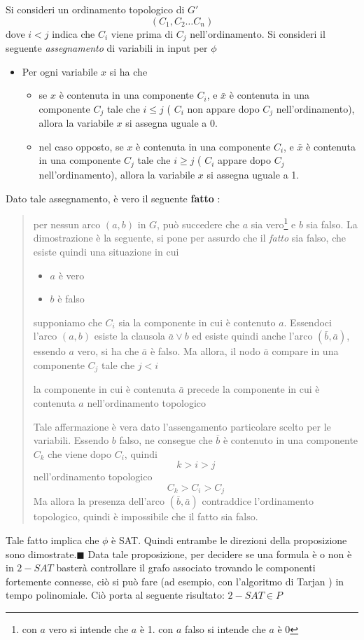 \documentclass[10pt, letterpaper]{report}
\begin{document}
Si consideri un ordinamento topologico di $G'$ $$ (C_1,C_2\dots C_n)$$ dove $i<j$ indica che $C_i$ viene prima di $C_j$ nell'ordinamento. Si consideri il seguente \textit{assegnamento} di variabili in input per $\phi$\begin{itemize}
    \item Per ogni variabile $x$ si ha che\begin{itemize}
        \item se $x$ è contenuta in una componente $C_i$, e $\bar x$ è contenuta in una componente $C_j$ tale che $i\le j$ ( $C_i$ non appare dopo $C_j$ nell'ordinamento), allora la variabile $x$ si assegna uguale a 0.
        \item nel caso opposto, se $x$ è contenuta in una componente $C_i$, e $\bar x$ è contenuta in una componente $C_j$ tale che $i\ge j$ ( $C_i$ appare dopo $C_j$ nell'ordinamento), allora la variabile $x$ si assegna uguale a 1.
    \end{itemize}
\end{itemize}
Dato tale assegnamento, è vero il seguente \textbf{fatto} :
\begin{quote}
per nessun arco $(a,b)$ in $G$,  può succedere che $a$ sia vero\footnote{con $a$ vero si intende che $a$ è 1. con $a$ falso si intende che $a$ è 0} e $b$ sia falso. La dimostrazione è la seguente, si pone per assurdo che il \textit{fatto} sia falso, che esiste quindi una situazione in cui\begin{itemize}
    \item 
 $a$ è vero \item  $b$ è falso\end{itemize} supponiamo che $C_i$ sia la componente in cui è contenuto $a$. Essendoci l'arco $(a,b)$ esiste la clausola $\bar a \lor b$ ed esiste quindi anche l'arco $(\bar b,\bar a)$, essendo $a$ vero, si ha che $\bar a$ è falso.
 Ma allora, il nodo $\bar a$ compare in una componente $C_j$ tale che $j<i$ \begin{center}la componente in cui è contenuta $\bar a$ precede la componente in cui è contenuta $a$ nell'ordinamento topologico\end{center}
 Tale affermazione è vera dato l'assengamento particolare scelto per le variabili. Essendo $b$ falso, ne consegue che $\bar b$ è contenuto in una componente $C_k$ che viene dopo $C_i$, quindi 
 $$ k>i>j$$
 nell'ordinamento topologico
 $$ C_k>C_i>C_j$$
 Ma allora la presenza dell'arco $(\bar b, \bar a)$ contraddice l'ordinamento topologico, quindi è impossibile che il fatto sia falso.
\end{quote} 
Tale fatto implica che $\phi$ è SAT. Quindi entrambe le direzioni della proposizione sono dimostrate.\hfill$\blacksquare$\acc 
Data tale proposizione, per decidere se una formula è o non è in $2-SAT$ basterà controllare il grafo associato trovando le componenti fortemente connesse, ciò si può fare (ad esempio, con l'algoritmo di Tarjan ) in tempo polinomiale. Ciò porta al seguente risultato:\acc
\teo{} $2-SAT\in P $
\flowerLine 
\end{document}
